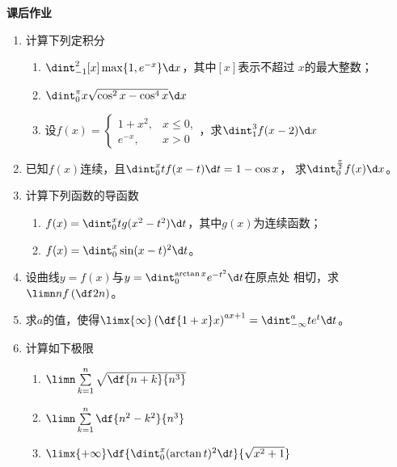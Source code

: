 \begin{ext}
	{\bf 课后作业}
	
	\begin{enumerate}
	  \item 计算下列定积分
	  \begin{enumerate}[(1)]
	    \item $\dint_{-1}^2[x]\max\{1,e^{-x}\}\d x$，其中$[x]$表示不超过
	    $x$的最大整数；
	    \item $\dint_0^{\pi}x\sqrt{\cos^2x-\cos^4x}\d x$
	    \item 设$f(x)=\left\{\begin{array}{ll}
	    	1+x^2, & x\leq0,\\ e^{-x}, & x>0
	    \end{array}\right.$，求$\dint_1^3f(x-2)\d x$
	  \end{enumerate}
	  \item 已知$f(x)$连续，且$\dint_0^xtf(x-t)\d t=1-\cos x$，
	  求$\dint_0^{\frac{\pi}2}f(x)\d x$。
	  \item 计算下列函数的导函数
	  \begin{enumerate}[(1)]
	    \item $f(x)=\dint_0^xtg(x^2-t^2)\d t$，其中$g(x)$为连续函数；
	    \item $f(x)=\dint_0^x\sin(x-t)^2\d t$。
	  \end{enumerate}
	  \item 设曲线$y=f(x)$与$y=\dint_0^{\arctan x}e^{-t^2}\d t$在原点处
	  相切，求$\limn nf\left(\df2n\right)$。
	  \item 求$a$的值，使得$\limx{\infty}\left(\df{1+x}x\right)^{ax+1}
	  =\dint_{-\infty}^ate^t\d t$。
	  \item 计算如下极限
	  \begin{enumerate}[(1)]
	    \item $\limn\sum\limits_{k=1}^n\sqrt{\df{n+k}{n^3}}$
	    \item $\limn\sum\limits_{k=1}^n\df{n^2-k^2}{n^3}$
	    \item $\limx{+\infty}\df{\dint_0^x(\arctan t)^2\d t}{\sqrt{x^2+1}}$
	  \end{enumerate}
	\end{enumerate}
\end{ext}

